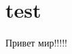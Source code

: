 \documentclass{labreport}
\title{\blindtext}
\begin{document}
    \maketitle

    \section{test}
    Привет мир!!!!!
\end{document}
